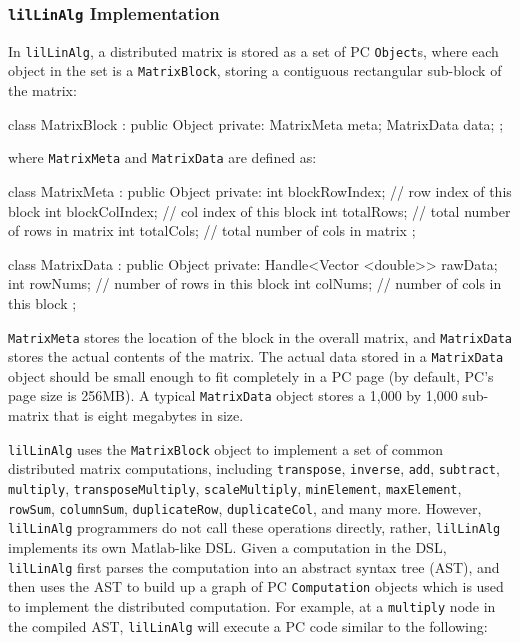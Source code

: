 \subsubsection{\texttt{lilLinAlg} Implementation}

In \texttt{lilLinAlg}, a distributed matrix is stored as a set of PC \texttt{Object}s, where each 
object in the set is a \texttt{MatrixBlock}, storing a contiguous rectangular sub-block of the matrix:

\begin{code}
class MatrixBlock : public Object {
private:
    MatrixMeta meta;
    MatrixData data;
};
\end{code}

\noindent where \texttt{MatrixMeta} and \texttt{MatrixData} are defined as:

\begin{code}
class MatrixMeta : public Object {
private:
    int blockRowIndex; // row index of this block
    int blockColIndex; // col index of this block
    int totalRows; // total number of rows in matrix 
    int totalCols; // total number of cols in matrix
};

class MatrixData : public Object {
private:
    Handle<Vector <double>> rawData;
    int rowNums; // number of rows in this block
    int colNums; // number of cols in this block
};
\end{code}

\noindent \texttt{MatrixMeta} stores the location of the block in the overall matrix, and
\texttt{MatrixData} stores the actual contents of the matrix.
The actual data stored in a \texttt{MatrixData} object should be small enough to fit completely in 
a PC page (by default, PC's page size is 256MB).  A typical \texttt{MatrixData} object stores a
1,000 by 1,000 sub-matrix that is eight megabytes in size.

\texttt{lilLinAlg} uses the \texttt{MatrixBlock} object to implement a set of common distributed matrix
computations, including \texttt{transpose},
\texttt{inverse}, \texttt{add}, \texttt{subtract}, \texttt{multiply}, \texttt{transposeMultiply}, 
\texttt{scaleMultiply}, \texttt{minElement},
\texttt{maxElement}, \texttt{rowSum}, \texttt{columnSum}, \texttt{duplicateRow}, \texttt{duplicateCol}, 
and many more.  However, \texttt{lilLinAlg} programmers do not call these operations directly, rather,
\texttt{lilLinAlg} implements its own Matlab-like DSL.  
Given a computation in the DSL, \texttt{lilLinAlg} first parses the computation into an abstract syntax tree (AST), and then
uses the AST to build up a graph of PC \texttt{Computation} objects which is used to implement the distributed computation.
For example, at a \texttt{multiply} node in the compiled AST, \texttt{lilLinAlg} 
will execute a PC code similar to the following:

